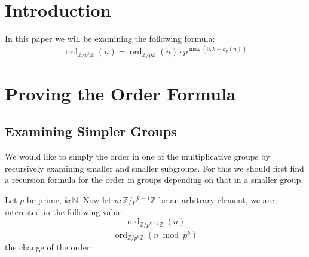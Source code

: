 \documentclass{article}
\title{\titlevar}
\author{\authorvar}
\date{\datevar}
\newcommand{\ordadd}[1]{\ord_{ℤ/{#1}ℤ}}
\DeclareMathOperator{\ord}{ord}
\newenvironment{pg}{

}{\medskip}
\begin{document}
	\maketitle
	
	\section{Introduction}
	
	\begin{pg}
		In this paper we will be examining the following formula:
		\begin{equation*}
			\ord_{ℤ/p^kℤ}(n) = \ord_{ℤ/pℤ}(n) · p^{\max(0, k - k_p(n))}
		\end{equation*}
	\end{pg}
	
	\section{Proving the Order Formula}
	
	\subsection{Examining Simpler Groups}
	\begin{pg}
		We would like to simply the order in one of the multiplicative groups by recursively examining smaller and smaller subgroups. For this we should first find a recursion formula for the order in groups depending on that in a smaller group.
	\end{pg}
	\begin{pg}
		Let $p$ be prime, $k ϵ ℕ$. Now let $n ϵ ℤ/p^{k+1}ℤ$ be an arbitrary element, we are interested in the following value:
		\begin{equation}\label{eq:1}
			\frac{\ordadd{p^{k+1}}(n)}{\ordadd{p^k}(n \bmod p^k)}
		\end{equation}
		the change of the order.
	\end{pg}
	
\end{document}

